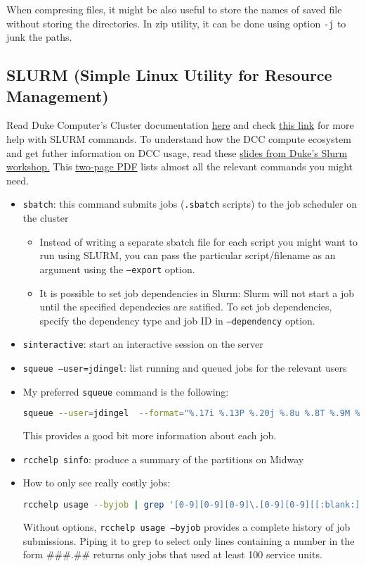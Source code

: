 When compresing files, it might be also useful to store the names of saved file without storing the directories.
In zip utility, it can be done using option \texttt{-j} to junk the paths.


\subsection{SLURM (Simple Linux Utility for Resource Management)}

Read Duke Computer's Cluster documentation \href{https://oit-rc.pages.oit.duke.edu/rcsupportdocs/dcc/}{here} and check \href{https://oit-rc.pages.oit.duke.edu/rcsupportdocs/dcc/slurm/}{this link} for more help with SLURM commands.
To understand how the DCC compute ecosystem and get futher information on DCC usage, read these \href{https://duke.box.com/s/zosu3w34iap7o4yuvlq44zep8ic27byq}{slides from Duke's Slurm workshop.}
This \href{https://slurm.schedmd.com/pdfs/summary.pdf}{two-page PDF} lists almost all the relevant commands you might need.

\begin{itemize}
	\item \texttt{sbatch}: this command submits jobs (\texttt{.sbatch} scripts) to the job scheduler on the cluster
	\begin{itemize}
		\item Instead of writing a separate sbatch file for each script you might want to run using SLURM, you can pass the particular script/filename as an argument using the \texttt{--export} option.
		\item It is possible to set job dependencies in Slurm: 
		Slurm will not start a job until the specified dependecies are satified.
		To set job dependencies, specify the dependency type and job ID in \texttt{--dependency} option.
	\end{itemize}
	\item \texttt{sinteractive}: start an interactive session on the server
	\item \texttt{squeue --user=jdingel}: list running and queued jobs for the relevant users
	\item My preferred \texttt{squeue} command is the following:
	\begin{lstlisting}[language=bash]
	squeue --user=jdingel  --format="%.17i %.13P %.20j %.8u %.8T %.9M %.9l %.6D %R" #jdjobs
	\end{lstlisting}
	This provides a good bit more information about each job.
	\item \texttt{rcchelp sinfo}: produce a summary of the partitions on Midway
	\item How to only see really costly jobs:
	\begin{lstlisting}[language=bash]
	rcchelp usage --byjob | grep '[0-9][0-9][0-9]\.[0-9][0-9][[:blank:]]|'
	\end{lstlisting}
	Without options, \texttt{rcchelp usage --byjob} provides a complete history of job submissions.
	Piping it to grep to select only lines containing a number in the form \#\#\#.\#\# returns only jobs that used at least 100 service units.
\end{itemize}

